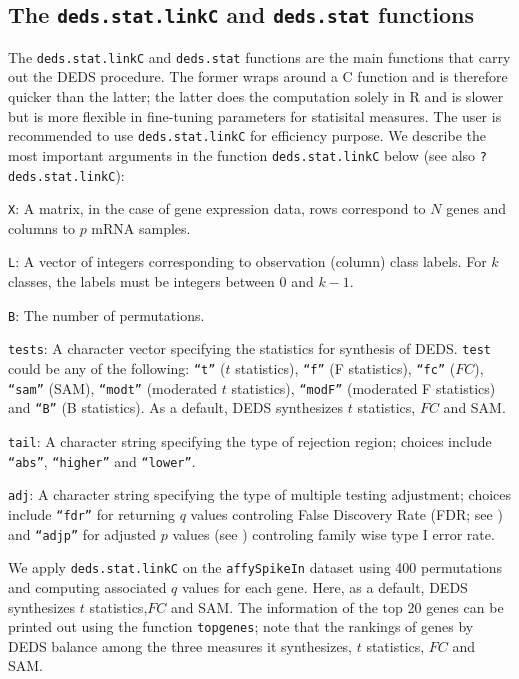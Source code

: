 \documentclass[11pt]{article}
\newcommand{\code}[1]{{\tt #1}}
\newcommand{\Rfunc}[1]{{\tt #1}}
\begin{document}
\subsection{The \Rfunc{deds.stat.linkC} and \Rfunc{deds.stat} functions}
The \Rfunc{deds.stat.linkC} and \Rfunc{deds.stat} functions are the main 
functions that carry out the DEDS procedure. The former wraps around a
C function and is therefore quicker than the latter; the latter does the 
computation solely in R and is slower but is more flexible in fine-tuning parameters
for statisital measures. The user is recommended to use \Rfunc{deds.stat.linkC}
for efficiency purpose. We describe the most important arguments in the function \Rfunc{deds.stat.linkC} below (see also \code{?deds.stat.linkC}):
\begin{description}
  \item{\code{X}: }{A  matrix, in the case of gene expression data, 
    rows correspond to $N$ genes and columns to $p$ mRNA samples.}
  \item{\code{L}: }{A vector of integers corresponding to observation (column)
    class labels. For $k$ classes, the labels must be integers
    between 0 and $k-1$.}
  \item{\code{B}: }{The number of permutations.}
  \item{\code{tests}: }{A character vector specifying the statistics
      for synthesis of DEDS. \code{test} could be any of the
      following: \code{``t''} ($t$ statistics), \code{``f''} (F statistics),
      \code{``fc''} ($FC$), \code{``sam''} (SAM), \code{``modt''} (moderated 
      $t$ statistics), \code{``modF''} (moderated F statistics) and 
      \code{``B''} (B statistics). As a default, DEDS synthesizes $t$ statistics, 
      $FC$ and SAM.}
 \item{\code{tail}: }{ A character string specifying the type of rejection
    region; choices include \code{``abs''}, \code{``higher''} and \code{``lower''}.}
 \item{\code{adj}: }{ A character string specifying the type of multiple testing
    adjustment; choices include \code{``fdr''} for returning $q$ values controling False 
    Discovery Rate (FDR; see \cite{Benjamini&Hochberg95}) and \code{``adjp''}
    for adjusted $p$ values (see \cite{Dudoit&Shaffer02}) controling family wise type I error rate.} 
 \end{description}

We apply \Rfunc{deds.stat.linkC} on the \code{affySpikeIn} dataset using
400 permutations and computing associated $q$ values for each gene. Here, 
as a default, DEDS synthesizes $t$ statistics,$FC$ and SAM. The information 
of the top 20 genes can be printed out using the function \code{topgenes};
note that the rankings of genes by DEDS balance among the three measures it 
synthesizes, $t$ statistics, $FC$ and SAM.
\end{document}

